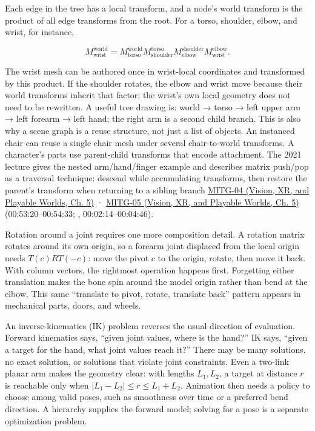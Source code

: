 Each edge in the tree has a local transform, and a node's world transform is the product of all edge transforms from the root. For a torso, shoulder, elbow, and wrist, for instance,

\[
M_{\mathrm{wrist}}^{\mathrm{world}}=
M_{\mathrm{torso}}^{\mathrm{world}}
M_{\mathrm{shoulder}}^{\mathrm{torso}}
M_{\mathrm{elbow}}^{\mathrm{shoulder}}
M_{\mathrm{wrist}}^{\mathrm{elbow}}.
\]

The wrist mesh can be authored once in wrist-local coordinates and transformed by this product. If the shoulder rotates, the elbow and wrist move because their world transforms inherit that factor; the wrist's own local geometry does not need to be rewritten. A useful tree drawing is: world → torso → left upper arm → left forearm → left hand; the right arm is a second child branch. This is also why a scene graph is a reuse structure, not just a list of objects. An instanced chair can reuse a single chair mesh under several chair-to-world transforms. A character's parts use parent-child transforms that encode attachment. The 2021 lecture gives the nested arm/hand/finger example and describes matrix push/pop as a traversal technique: descend while accumulating transforms, then restore the parent's transform when returning to a sibling branch \href{../07-Vision-XR-and-Playable-Worlds/main.pdf\#nameddest=04-visual-computing-ii-ch036-mitg-04---transformations}{MITG-04 (Vision, XR, and Playable Worlds, Ch. 5)} · \href{../07-Vision-XR-and-Playable-Worlds/main.pdf\#nameddest=04-visual-computing-ii-ch036-mitg-05---hierarchical-modeling}{MITG-05 (Vision, XR, and Playable Worlds, Ch. 5)} (00:53:20--00:54:33; , 00:02:14--00:04:46).

Rotation around a joint requires one more composition detail. A rotation matrix rotates around its own origin, so a forearm joint displaced from the local origin needs \(T(c)RT(-c)\): move the pivot \(c\) to the origin, rotate, then move it back. With column vectors, the rightmost operation happens first. Forgetting either translation makes the bone spin around the model origin rather than bend at the elbow. This same ``translate to pivot, rotate, translate back'' pattern appears in mechanical parts, doors, and wheels.

An inverse-kinematics (IK) problem reverses the usual direction of evaluation. Forward kinematics says, ``given joint values, where is the hand?'' IK says, ``given a target for the hand, what joint values reach it?'' There may be many solutions, no exact solution, or solutions that violate joint constraints. Even a two-link planar arm makes the geometry clear: with lengths \(L_1,L_2\), a target at distance \(r\) is reachable only when \(|L_1-L_2|\le r\le L_1+L_2\). Animation then needs a policy to choose among valid poses, such as smoothness over time or a preferred bend direction. A hierarchy supplies the forward model; solving for a pose is a separate optimization problem.


